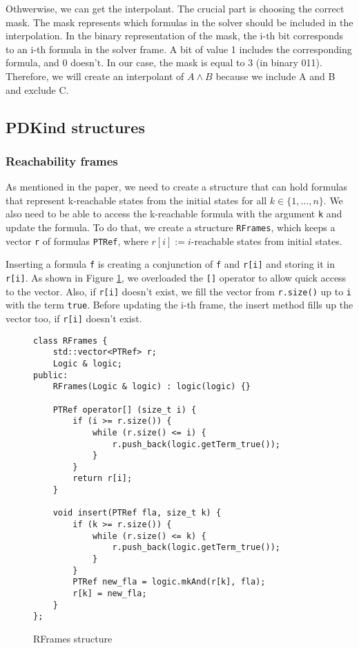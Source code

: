 Othwerwise, we can get the interpolant. The crucial part is choosing the correct mask. The mask represents which formulas in the solver should be included in the interpolation. In the binary representation of the mask, the i-th bit corresponds to an i-th formula in the solver frame. A bit of value 1 includes the corresponding formula, and 0 doesn't. In our case, the mask is equal to 3 (in binary 011). Therefore, we will create an interpolant of $A \wedge B$ because we include A and B and exclude C.


\subsection{PDKind structures}


\subsubsection{Reachability frames}
\noindent As mentioned in the paper\cite{7886665}, we need to create a structure that can hold formulas that represent k-reachable states from the initial states for all $k \in \{1,\dots,n\}$. We also need to be able to access the k-reachable formula with the argument \texttt{k} and update the formula. To do that, we create a structure \texttt{RFrames}, which keeps a vector \texttt{r} of formulas \texttt{PTRef}, where $r[i] := i$-reachable states from initial states. 

Inserting a formula \texttt{f} is creating a conjunction of \texttt{f} and \texttt{r[i]} and storing it in \texttt{r[i]}. As shown in Figure \ref{code:RFrames}, we overloaded the \texttt{[]} operator to allow quick access to the vector. Also, if \texttt{r[i]} doesn't exist, we fill the vector from \texttt{r.size()} up to \texttt{i} with the term \texttt{true}. Before updating the i-th frame, the insert method fills up the vector too, if \texttt{r[i]} doesn't exist.

\begin{figure}[H]
\begin{lstlisting}
class RFrames {
    std::vector<PTRef> r;
    Logic & logic;
public:
    RFrames(Logic & logic) : logic(logic) {}

    PTRef operator[] (size_t i) {
        if (i >= r.size()) {
            while (r.size() <= i) {
                r.push_back(logic.getTerm_true());
            }
        }
        return r[i];
    }

    void insert(PTRef fla, size_t k) {
        if (k >= r.size()) {
            while (r.size() <= k) {
                r.push_back(logic.getTerm_true());
            }
        }
        PTRef new_fla = logic.mkAnd(r[k], fla);
        r[k] = new_fla;
    }
};
\end{lstlisting}
\caption{RFrames structure}\label{code:RFrames}
\end{figure}


